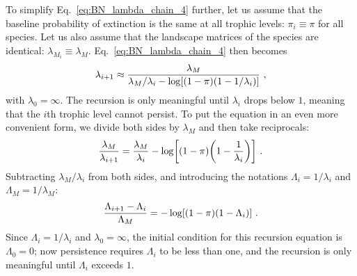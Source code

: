 \documentclass[11pt]{article}
\let\originalleft\left
\let\originalright\right
\renewcommand{\left}{\mathopen{}\mathclose\bgroup\originalleft}
\renewcommand{\right}{\aftergroup\egroup\originalright}
\begin{document}
To simplify Eq.~\ref{eq:BN_lambda_chain_4} further, let us assume that the baseline probability of extinction is the same at all trophic levels: $\pi_i \equiv \pi$ for all species. Let us also assume that the landscape matrices of the species are identical: $\lambda_{M_i} \equiv \lambda_M$. Eq.~\ref{eq:BN_lambda_chain_4} then becomes
\begin{equation}
  \label{eq:BN_lambda_chain_5}
  \lambda_{i+1} \approx \frac{\lambda_M}{\lambda_M / \lambda_i -\log \left[ (1 -
      \pi) (1-1/\lambda_i) \right]} \ ,
\end{equation}
with $\lambda_0 = \infty$. The recursion is only meaningful until $\lambda_i$ drops below $1$, meaning that the $i$th trophic level cannot persist. To put the equation in an even more convenient form, we divide both sides by $\lambda_M$ and then take reciprocals:
\begin{equation}
  \label{eq:BN_lambda_chain_invert}
  \frac{\lambda_M}{\lambda_{i+1}} = \frac{\lambda_M}{\lambda_i} -
  \log \left[ (1 - \pi) \left( 1 - \frac{1}{\lambda_i} \right) \right] \ .
\end{equation}
Subtracting $\lambda_M/\lambda_i$ from both sides, and introducing the notations $\Lambda_i = 1/\lambda_i$ and $\Lambda_M = 1/\lambda_M$:
\begin{equation}
  \label{eq:BN_Lambda_chain}
  \frac{\Lambda_{i+1} - \Lambda_i}{\Lambda_M} =
  - \log \left[ (1 - \pi) (1 - \Lambda_i) \right] \ .
\end{equation}
Since $\Lambda_i = 1/\lambda_i$ and $\lambda_0 = \infty$, the initial condition for this recursion equation is $\Lambda_0 = 0$; now persistence requires $\Lambda_i$ to be less than one, and the recursion is only meaningful until $\Lambda_i$ exceeds $1$.
\end{document}
